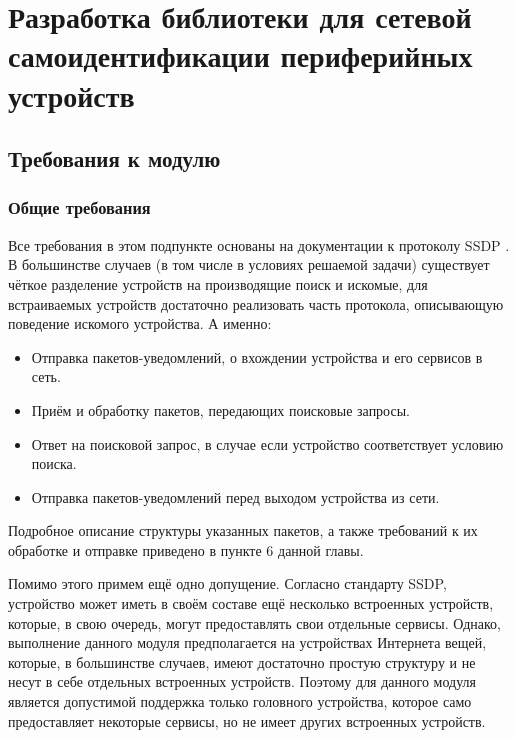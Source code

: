 \chapter{Разработка библиотеки для сетевой самоидентификации периферийных устройств}

\section{Требования к модулю}
	
\subsection{Общие требования}

Все требования в этом подпункте основаны на документации к протоколу SSDP \cite{web:upnp}.
В большинстве случаев (в том числе в условиях решаемой задачи) существует чёткое разделение устройств на производящие поиск и искомые, для встраиваемых устройств достаточно реализовать часть протокола, описывающую поведение искомого устройства.
А именно:
\begin{itemize}
	\item Отправка пакетов-уведомлений, о вхождении устройства и его сервисов в сеть.
	\item Приём и обработку пакетов, передающих поисковые запросы.
	\item Ответ на поисковой запрос, в случае если устройство соответствует условию поиска.
	\item Отправка пакетов-уведомлений перед выходом устройства из сети.
\end{itemize}
Подробное описание структуры указанных пакетов, а также требований к их обработке и отправке приведено в пункте 6 данной главы.

Помимо этого примем ещё одно допущение.
Согласно стандарту SSDP, устройство может иметь в своём составе ещё несколько встроенных устройств, которые, в свою очередь, могут предоставлять свои отдельные сервисы.
Однако, выполнение данного модуля предполагается на устройствах Интернета вещей, которые, в большинстве случаев, имеют достаточно простую структуру и не несут в себе отдельных встроенных устройств.
Поэтому для данного модуля является допустимой поддержка только головного устройства, которое само предоставляет некоторые сервисы, но не имеет других встроенных устройств.


